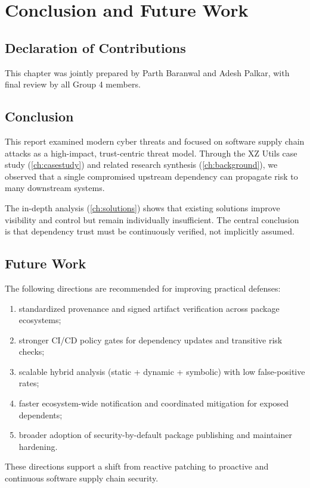 \chapter{Conclusion and Future Work}
\label{ch:conclusion}

\section*{Declaration of Contributions}
This chapter was jointly prepared by Parth Baranwal and Adesh Palkar,
with final review by all Group 4 members.

\section{Conclusion}

This report examined modern cyber threats and focused on software supply chain attacks
as a high-impact, trust-centric threat model. Through the XZ Utils case study
(\cref{ch:casestudy}) and related research synthesis (\cref{ch:background}), we observed that
a single compromised upstream dependency can propagate risk to many downstream systems.

The in-depth analysis (\cref{ch:solutions}) shows that existing solutions improve visibility
and control but remain individually insufficient. The central conclusion is that dependency
trust must be continuously verified, not implicitly assumed.

\section{Future Work}

The following directions are recommended for improving practical defenses:

\begin{enumerate}
\item standardized provenance and signed artifact verification across package ecosystems;
\item stronger CI/CD policy gates for dependency updates and transitive risk checks;
\item scalable hybrid analysis (static + dynamic + symbolic) with low false-positive rates;
\item faster ecosystem-wide notification and coordinated mitigation for exposed dependents;
\item broader adoption of security-by-default package publishing and maintainer hardening.
\end{enumerate}

These directions support a shift from reactive patching to proactive and continuous
software supply chain security.
